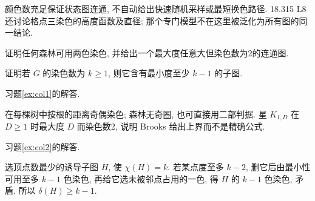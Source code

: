 颜色数充足保证状态图连通, 不自动给出快速随机采样或最短换色路径. 18.315 L8 还讨论格点三染色的高度函数及直径; 那个专门模型不在这里被泛化为所有图的同一结论.
\begin{exercise}\label{ex:col1}
证明任何森林可用两色染色, 并给出一个最大度任意大但染色数为2的连通图.
\end{exercise}
\begin{exercise}\label{ex:col2}
证明若 $G$ 的染色数为 $k\ge1$, 则它含有最小度至少 $k-1$ 的子图.
\end{exercise}
习题\ref{ex:col1}的解答.
\begin{solution}
在每棵树中按根的距离奇偶染色; 森林无奇圈, 也可直接用二部判据. 星 $K_{1,D}$ 在 $D\ge1$ 时最大度 $D$ 而染色数2, 说明 Brooks 给出上界而不是精确公式.
\end{solution}
习题\ref{ex:col2}的解答.
\begin{solution}
选顶点数最少的诱导子图 $H$, 使 $\chi(H)=k$. 若某点度至多 $k-2$, 删它后由最小性可用至多 $k-1$ 色染色, 再给它选未被邻点占用的一色, 得 $H$ 的 $k-1$ 色染色, 矛盾. 所以 $\delta(H)\ge k-1$.
\end{solution}
